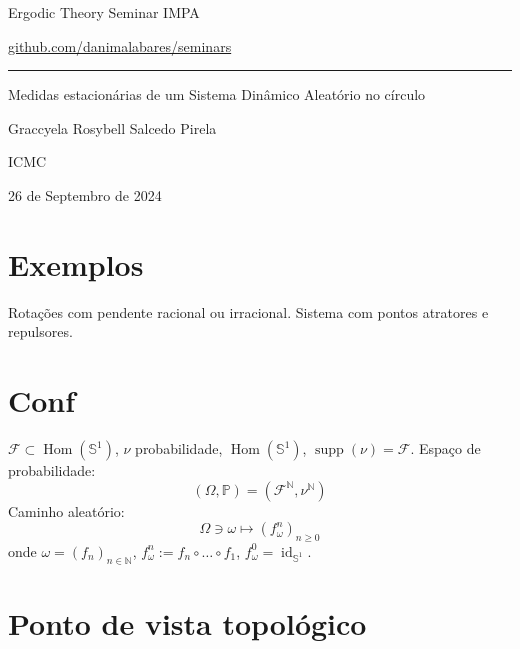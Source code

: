 \renewcommand*{\contentsname}{}  



\begin{minipage}{\textwidth}
	\begin{minipage}{1\textwidth}
		Ergodic Theory Seminar \hfill IMPA
		
		{\small\hfill\href{https://github.com/danimalabares/seminars}{github.com/danimalabares/seminars}}
	\end{minipage}
\end{minipage}\vspace{.2cm}\hrule

\vspace{10pt}

{\Huge Medidas estacionárias de um Sistema Dinâmico Aleatório no círculo}

\vspace{1em}
\hfill{\Large Graccyela Rosybell Salcedo Pirela}

\hfill{\large ICMC}

\hfill{\large 26 de Septembro de 2024}

\vspace{-2em}
\tableofcontents

\section{Exemplos}

Rotações  com pendente racional ou irracional. Sistema com pontos atratores e repulsores.

\section{Conf}
	$\mathcal{F}\subset \operatorname{Hom}(\mathbb{S}^1)$, $ \nu$ probabilidade, $\operatorname{Hom}(\mathbb{S}^1)$, $\operatorname{supp}(\nu)=\mathcal{F}$. Espaço de probabilidade:
	\[(\Omega,\mathbb{P})=(\mathcal{F}^{\mathbb{N}},\nu^{\mathbb{N}})\]
	Caminho aleatório:
	\[\Omega \ni \omega\longmapsto(f^n_\omega)_{n\geq 0}\]
	onde $\omega=(f_n)_{ n \in \mathbb{N}}$, $f_{\omega}^n:=f_n\circ \ldots \circ f_1$,  $f^0_\omega =\operatorname{id}_{\mathbb{S}^1}$.

\section{Ponto de vista topológico}

